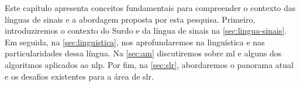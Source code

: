 Este capítulo apresenta conceitos fundamentais para compreender o contexto das línguas de sinais e a abordagem proposta por esta pesquisa.
Primeiro, introduziremos o contexto do Surdo e da língua de sinais na \autoref{sec:lingua-sinais}.
Em seguida, na \autoref{sec:linguistica}, nos aprofundaremos na linguística e nas particularidades dessa língua.
Na \autoref{sec:am} discutiremos sobre \acrlong{ml} e alguns dos algoritmos aplicados ao \acrlong{nlp}.
Por fim, na \autoref{sec:slr}, abordaremos o panorama atual e os desafios existentes para a área de \acrlong{slr}.







